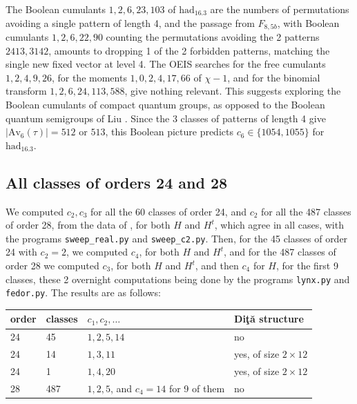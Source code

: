 \documentclass[11pt]{amsart}
\begin{document}
\medskip

\noindent The Boolean cumulants $1,2,6,23,103$ of $\mathrm{had}_{16.3}$ are the numbers of permutations avoiding a single pattern of length 4, and the passage from $F_{8,5b}$, with Boolean cumulants $1,2,6,22,90$ counting the permutations avoiding the 2 patterns $2413,3142$, amounts to dropping 1 of the 2 forbidden patterns, matching the single new fixed vector at level 4. The OEIS searches for the free cumulants $1,2,4,9,26$, for the moments $1,0,2,4,17,66$ of $\chi-1$, and for the binomial transform $1,2,6,24,113,588$, give nothing relevant. This suggests exploring the Boolean cumulants of compact quantum groups, as opposed to the Boolean quantum semigroups of Liu \cite{liu}. Since the 3 classes of patterns of length 4 give $|\mathrm{Av}_6(\tau)|=512$ or $513$, this Boolean picture predicts $c_6\in\{1054,1055\}$ for $\mathrm{had}_{16.3}$.

\subsection{All classes of orders 24 and 28}\label{sec:orders}

We computed $c_2,c_3$ for all the 60 classes of order 24, and $c_2$ for all the 487 classes of order 28, from the data of \cite{mck}, for both $H$ and $H^t$, which agree in all cases, with the programs \texttt{sweep\_real.py} and \texttt{sweep\_c2.py}. Then, for the 45 classes of order 24 with $c_2=2$, we computed $c_4$, for both $H$ and $H^t$, and for the 487 classes of order 28 we computed $c_3$, for both $H$ and $H^t$, and then $c_4$ for $H$, for the first 9 classes, these 2 overnight computations being done by the programs \texttt{lynx.py} and \texttt{fedor.py}. The results are as follows:

\medskip

\begin{center}
\begin{tabular}{llll}
\toprule
order & classes & $c_1,c_2,\ldots$ & Di\c t\u a structure\\
\midrule
24 & 45 & $1,2,5,14$ & no\\
24 & 14 & $1,3,11$ & yes, of size $2\times12$\\
24 & 1 & $1,4,20$ & yes, of size $2\times12$\\
28 & 487 & $1,2,5$, and $c_4=14$ for 9 of them & no\\
\bottomrule
\end{tabular}
\end{center}
\end{document}
